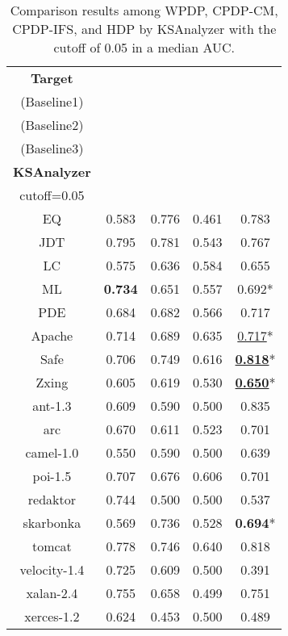 \begin{table}[!t]
\centering
\caption{Comparison results among WPDP, CPDP-CM, CPDP-IFS,
and HDP by KSAnalyzer with the cutoff of 0.05 in a median AUC.
}
\label{tab:result_overview}
\begin{tabular}{|@{ }c@{ }||c|c|c||@{ }c@{ }|}
\hline
{\bf Target}
& \specialcell{{\bf WPDP}\\{(Baseline1)}} 
&\specialcell{{\bf CPDP-CM}\\{(Baseline2)}}
&\specialcell{{\bf CPDP-IFS}\\{(Baseline3)}}
&\specialcell{{\bf HDP}\\{\bf KSAnalyzer}\\{cutoff=0.05}}
\\
\hline \hline

EQ			&0.583	& 0.776	&0.461  &0.783		\\ \hline
JDT			&0.795	& 0.781 	&0.543	&0.767	 \\ \hline
LC			&0.575	& 0.636 &0.584	&0.655		\\ \hline
ML			&{\bf 0.734}	& 0.651 &0.557	&0.692*		\\ \hline
PDE			&0.684	& 0.682 &0.566	&0.717	 	\\ \hline \hline

Apache		&0.714	& 0.689  &0.635	&\underline{0.717}*		\\ \hline
Safe			&0.706	& 0.749  &0.616	&{\bf \underline{0.818}}*	 	\\ \hline
Zxing		&0.605	& 0.619  &0.530	&{\bf \underline{0.650}}*		\\ \hline \hline

ant-1.3		&0.609	& 0.590	&0.500	&0.835	 \\ \hline
arc			&0.670	& 0.611 &0.523	&0.701		\\ \hline
camel-1.0	&0.550	& 0.590	&0.500	&0.639	\\ \hline
poi-1.5		&0.707	& 0.676 &0.606	&0.701		\\ \hline
redaktor		&0.744	& 0.500 &0.500	&0.537		\\ \hline
skarbonka	&0.569	& 0.736 &0.528	&{\bf 0.694}*	 	\\ \hline
tomcat		&0.778	& 0.746 &0.640	&0.818		\\ \hline
velocity-1.4	& 0.725	& 0.609 &0.500	&0.391		\\ \hline
xalan-2.4	&0.755	& 0.658 &0.499	&0.751		\\ \hline
xerces-1.2	&0.624	& 0.453 &0.500	&0.489		\\ \hline \hline


\end{tabular}
\end{table}
